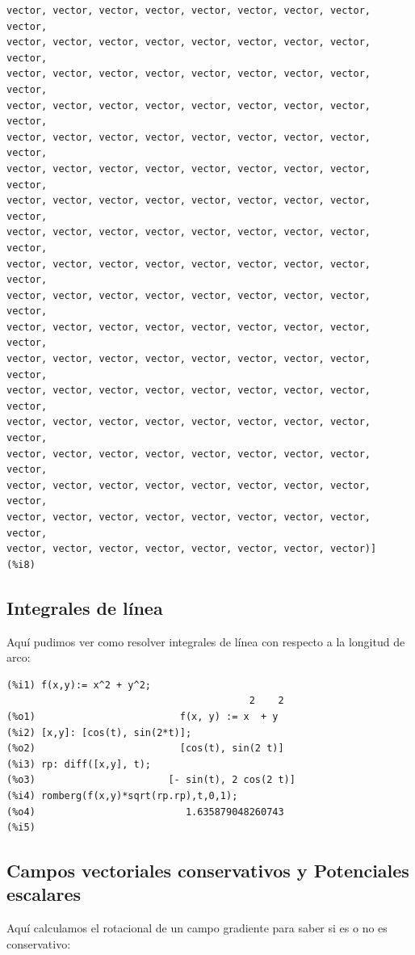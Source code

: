\documentclass[12pt,letterpaper]{article}
\begin{document}
\begin{verbatim}
vector, vector, vector, vector, vector, vector, vector, vector, vector, 
vector, vector, vector, vector, vector, vector, vector, vector, vector, 
vector, vector, vector, vector, vector, vector, vector, vector, vector, 
vector, vector, vector, vector, vector, vector, vector, vector, vector, 
vector, vector, vector, vector, vector, vector, vector, vector, vector, 
vector, vector, vector, vector, vector, vector, vector, vector, vector, 
vector, vector, vector, vector, vector, vector, vector, vector, vector, 
vector, vector, vector, vector, vector, vector, vector, vector, vector, 
vector, vector, vector, vector, vector, vector, vector, vector, vector, 
vector, vector, vector, vector, vector, vector, vector, vector, vector, 
vector, vector, vector, vector, vector, vector, vector, vector, vector, 
vector, vector, vector, vector, vector, vector, vector, vector, vector, 
vector, vector, vector, vector, vector, vector, vector, vector, vector, 
vector, vector, vector, vector, vector, vector, vector, vector, vector, 
vector, vector, vector, vector, vector, vector, vector, vector, vector, 
vector, vector, vector, vector, vector, vector, vector, vector, vector, 
vector, vector, vector, vector, vector, vector, vector, vector, vector, 
vector, vector, vector, vector, vector, vector, vector, vector)]
(%i8) 
\end{verbatim}

\subsection{Integrales de línea}
Aquí pudimos ver como resolver integrales de línea con respecto a la longitud de arco: 

\begin{verbatim}
(%i1) f(x,y):= x^2 + y^2;
                                          2    2
(%o1)                         f(x, y) := x  + y
(%i2) [x,y]: [cos(t), sin(2*t)];
(%o2)                         [cos(t), sin(2 t)]
(%i3) rp: diff([x,y], t);
(%o3)                       [- sin(t), 2 cos(2 t)]
(%i4) romberg(f(x,y)*sqrt(rp.rp),t,0,1);
(%o4)                          1.635879048260743
(%i5) 
\end{verbatim}

\subsection{Campos vectoriales conservativos y Potenciales escalares}
Aquí calculamos el rotacional de un campo gradiente para saber si es o no es conservativo:
\end{document}
